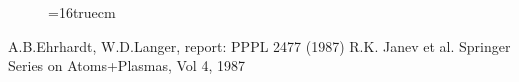 \documentclass[12pt]{article}
\begin{document}
\begin{figure} \label{met.3_3.2}
\epsfxsize=16truecm
\end{figure}
 
\newpage
\begin{thebibliography}{99}
  A.B.Ehrhardt, W.D.Langer, report: PPPL 2477
                       (1987)
 R.K. Janev et al.  Springer Series on Atoms+Plasmas,
                   Vol 4, 1987
\end{thebibliography}
 
\end{document}
